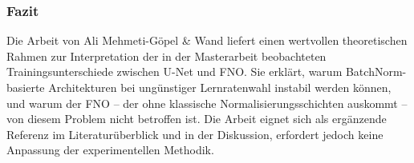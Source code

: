 \documentclass[a4paper,12pt]{article}
\begin{document}
\subsubsection*{Fazit}

Die Arbeit von Ali Mehmeti-Göpel \& Wand liefert einen wertvollen theoretischen Rahmen zur Interpretation der in der Masterarbeit beobachteten Trainingsunterschiede zwischen U-Net und FNO. Sie erklärt, warum BatchNorm-basierte Architekturen bei ungünstiger Lernratenwahl instabil werden können, und warum der FNO -- der ohne klassische Normalisierungsschichten auskommt -- von diesem Problem nicht betroffen ist. Die Arbeit eignet sich als ergänzende Referenz im Literaturüberblick und in der Diskussion, erfordert jedoch keine Anpassung der experimentellen Methodik.
\end{document}
